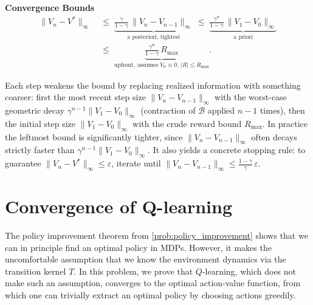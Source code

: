 \documentclass[11pt]{article}
\begin{document}
\begin{callout}[note]
\textbf{Convergence Bounds}
\begin{align*}
\|V_n - V^*\|_\infty
\;&\le\; \underbrace{\tfrac{\gamma}{1-\gamma}\, \|V_n - V_{n-1}\|_\infty}_{\text{a~posteriori, tightest}}
\;\le\; \underbrace{\tfrac{\gamma^n}{1-\gamma}\, \|V_1 - V_0\|_\infty}_{\text{a~priori}} \\
\;&\le\; \underbrace{\tfrac{\gamma^n}{1-\gamma}\, R_{\max}}_{\text{upfront, assumes } V_0 \equiv 0,\, |R| \le R_{\max}}.
\end{align*}
\end{callout}
Each step weakens the bound by replacing realized information with something coarser: first the most recent step size $\|V_n - V_{n-1}\|_\infty$ with the worst-case geometric decay $\gamma^{n-1}\|V_1 - V_0\|_\infty$ (contraction of $\mathcal{B}$ applied $n-1$ times), then the initial step size $\|V_1 - V_0\|_\infty$ with the crude reward bound $R_{\max}$. In practice the leftmost bound is significantly tighter, since $\|V_n - V_{n-1}\|_\infty$ often decays strictly faster than $\gamma^{n-1}\|V_1 - V_0\|_\infty$. It also yields a concrete stopping rule: to guarantee $\|V_n - V^*\|_\infty \le \varepsilon$, iterate until $\|V_n - V_{n-1}\|_\infty \le \frac{1-\gamma}{\gamma}\, \varepsilon$.



\section{Convergence of Q-learning}\label{prob:q_learning}

The policy improvement theorem from \cref{prob:policy_improvement} shows that we can in principle find an optimal policy in MDPs. However, it makes the uncomfortable assumption that we know the environment dynamics via the transition kernel $T$. In this problem, we prove that $Q$-learning, which does not make such an assumption, converges to the optimal action-value function, from which one can trivially extract an optimal policy by choosing actions greedily.
\end{document}
